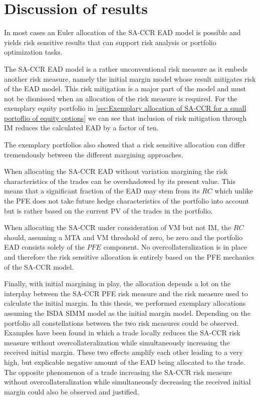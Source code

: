 \documentclass[../Thesis_AHoecherl.tex]{subfiles}
\begin{document}
    \chapter{Discussion of results}\label{sec:Discussion of results}

    In most cases an Euler allocation of the \gls{SA-CCR} \gls{EAD} model is possible and yields risk sensitive results that can support risk analysis or portfolio optimization tasks.

    The \gls{SA-CCR} \gls{EAD} model is a rather unconventional risk measure as it embeds another risk measure, namely the initial margin model whose result mitigates risk of the \gls{EAD} model.
    This risk mitigation is a major part of the model and must not be dismissed when an allocation of the risk measure is required. For the exemplary equity portfolio in \ref{sec:Exemplary allocation of SA-CCR for a small portoflio of equity options} we can see that inclusion of risk mitigation through \gls{IM} reduces the calculated \gls{EAD} by a factor of ten.

    The exemplary portfolios also showed that a risk sensitive allocation can differ tremendously between the different margining approaches. 
    
    When allocating the \gls{SA-CCR} \gls{EAD} without variation margining the risk characteristics of the trades can be overshadowed by its present value. This means that a significant fraction of the \gls{EAD} may stem from its $RC$ which unlike the PFE does not take future hedge characteristics of the portfolio into account but is rather based on the current \gls{PV} of the trades in the portfolio.

    When allocating the \gls{SA-CCR} under consideration of \gls{VM} but not \gls{IM}, the $RC$ should, assuming a \gls{MTA} and \gls{VM} threshold of zero, be zero and the portfolio \gls{EAD} consists solely of the $PFE$ component. No overcollateralization is in place and therefore the risk sensitive allocation is entirely based on the PFE mechanics of the \gls{SA-CCR} model.

    Finally, with initial margining in play, the allocation depends a lot on the interplay between the \gls{SA-CCR} PFE risk measure and the risk measure used to calculate the initial margin. In this thesis, we performed exemplary allocations assuming the \gls{ISDA SIMM} model as the initial margin model. 
    Depending on the portfolio all constellations between the two risk measures could be observed. Examples have been found in which a trade locally reduces the \gls{SA-CCR} risk measure without overcollateralization while simultaneously increasing the received initial margin. These two effects amplify each other leading to a very high, but explicable negative amount of the \gls{EAD} being allocated to the trade. The opposite phenomenon of a trade increasing the \gls{SA-CCR} risk measure without overcollateralization while simultaneously decreasing the received initial margin could also be observed and justified.
\end{document}
